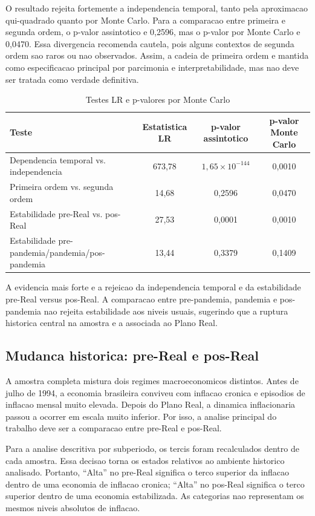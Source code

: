 O resultado rejeita fortemente a independencia temporal, tanto pela aproximacao qui-quadrado quanto por Monte Carlo. Para a comparacao entre primeira e segunda ordem, o p-valor assintotico e 0,2596, mas o p-valor por Monte Carlo e 0,0470. Essa divergencia recomenda cautela, pois alguns contextos de segunda ordem sao raros ou nao observados. Assim, a cadeia de primeira ordem e mantida como especificacao principal por parcimonia e interpretabilidade, mas nao deve ser tratada como verdade definitiva.

\begin{table}[H]
\centering
\caption{Testes LR e p-valores por Monte Carlo}
\label{tab:testes_lr}
\begin{tabular}{lccc}
\hline
Teste & Estatistica LR & p-valor assintotico & p-valor Monte Carlo \\
\hline
Dependencia temporal vs. independencia & 673,78 & \(1,65\times 10^{-144}\) & 0,0010 \\
Primeira ordem vs. segunda ordem & 14,68 & 0,2596 & 0,0470 \\
Estabilidade pre-Real vs. pos-Real & 27,53 & 0,0001 & 0,0010 \\
Estabilidade pre-pandemia/pandemia/pos-pandemia & 13,44 & 0,3379 & 0,1409 \\
\hline
\end{tabular}
\end{table}

A evidencia mais forte e a rejeicao da independencia temporal e da estabilidade pre-Real versus pos-Real. A comparacao entre pre-pandemia, pandemia e pos-pandemia nao rejeita estabilidade aos niveis usuais, sugerindo que a ruptura historica central na amostra e a associada ao Plano Real.

\subsection{Mudanca historica: pre-Real e pos-Real}

A amostra completa mistura dois regimes macroeconomicos distintos. Antes de julho de 1994, a economia brasileira conviveu com inflacao cronica e episodios de inflacao mensal muito elevada. Depois do Plano Real, a dinamica inflacionaria passou a ocorrer em escala muito inferior. Por isso, a analise principal do trabalho deve ser a comparacao entre pre-Real e pos-Real.

Para a analise descritiva por subperiodo, os tercis foram recalculados dentro de cada amostra. Essa decisao torna os estados relativos ao ambiente historico analisado. Portanto, ``Alta'' no pre-Real significa o terco superior da inflacao dentro de uma economia de inflacao cronica; ``Alta'' no pos-Real significa o terco superior dentro de uma economia estabilizada. As categorias nao representam os mesmos niveis absolutos de inflacao.

